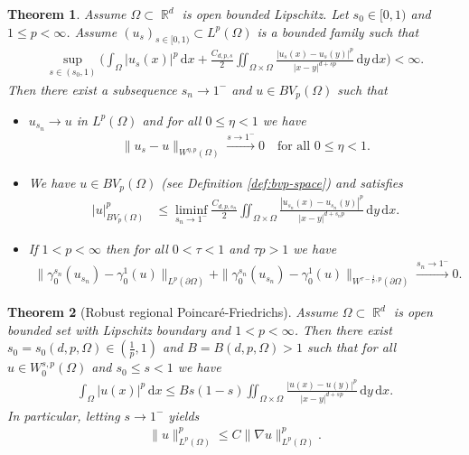 \documentclass[10pt,a4paper]{amsart}
\newtheorem{theorem}{Theorem}
\DeclareMathOperator{\R}{\mathbb{R}}
\renewcommand{\d}{\,\mathrm{d}}
\begin{document}
\begin{theorem}\label{thm:asymp-compact-frac}
Assume $\Omega \subset \R^d$ is open bounded Lipschitz. Let $s_0 \in [0,1)$ and $1\leq p<\infty$. Assume $(u_s)_{s\in[0,1)} \subset L^p(\Omega)$ is a bounded family such that
\begin{align*}
\sup_{s\in(s_0,1)}
\Big(\int_\Omega |u_s(x)|^p\d x+ \frac{C_{d,p,s}}{2}
\iint_{\Omega \times \Omega} \frac{|u_s(x)-u_s(y)|^p}{|x-y|^{d+sp}} \d y\d x\Big)<\infty.
\end{align*}
 Then there exist a subsequence $s_n\to 1^-$ and $u \in BV_p(\Omega)$ such that
\begin{itemize}
\item $u_{s_n}\to u$ in $L^p(\Omega)$ and  for all $0\leq \eta<1$ we have
\begin{align*}
\|u_s-u\|_{W^{\eta,p}(\Omega)}
\xrightarrow{s\to 1^-}0\quad \text{for all $0\leq \eta<1$}.
\end{align*}
\item  %
We have $u\in BV_p(\Omega)$ (see Definition \ref{def:bvp-space}) and satisfies
\begin{align*}
|u|^p_{BV_p(\Omega)}
&\leq \liminf_{s_n\to 1^-} \frac{C_{d,p,s_n}}{2}
\iint_{\Omega \times \Omega} \frac{|u_{s_n}(x)-u_{s_n}(y)|^p}{|x-y|^{d+s_np}} \d y\d x.
\end{align*}
\item If $1<p<\infty$ then for all $0< \tau <1$ and $\tau p>1$ we have
\begin{align*}
\|\gamma^{s_n}_0(u_{s_n})-\gamma^1_0(u)\|_{L^{p}(\partial \Omega)}+ \|\gamma_0^{s_n} (u_{s_n})-\gamma^1_0(u)\|_{W^{\tau-\frac{1}{p},p}(\partial \Omega)}
\xrightarrow{s_n\to 1^-}0.
\end{align*}
\end{itemize}
\end{theorem}

\begin{theorem}[Robust regional Poincar\'e-Friedrichs]
\label{thm:robust-poinca-fried-regio}
Assume  $\Omega\subset \R^d$ is open  bounded set with Lipschitz boundary and $1< p <\infty$. Then there exist $s_0= s_0(d,p,\Omega)\in (\frac{1}{p},1 )$  and $B=B(d,p,\Omega)>1$ such that for all $u\in W^{s,p}_0(\Omega)$  and $s_0 \leq s <1$  we have
\begin{align*}
\int_\Omega |u(x)|^p\d x\leq Bs(1-s) \iint_{ \Omega \times \Omega}\frac{|u(x)-u(y)|^p}{|x-y|^{d+sp}}\d y \d x.
\end{align*}
In particular, letting  $s\to 1^-$ yields
\begin{align*}
\|u\|^p_{L^p(\Omega)}\leq C\|\nabla u\|^p_{L^p(\Omega)}.
\end{align*}
\end{theorem}
\end{document}
